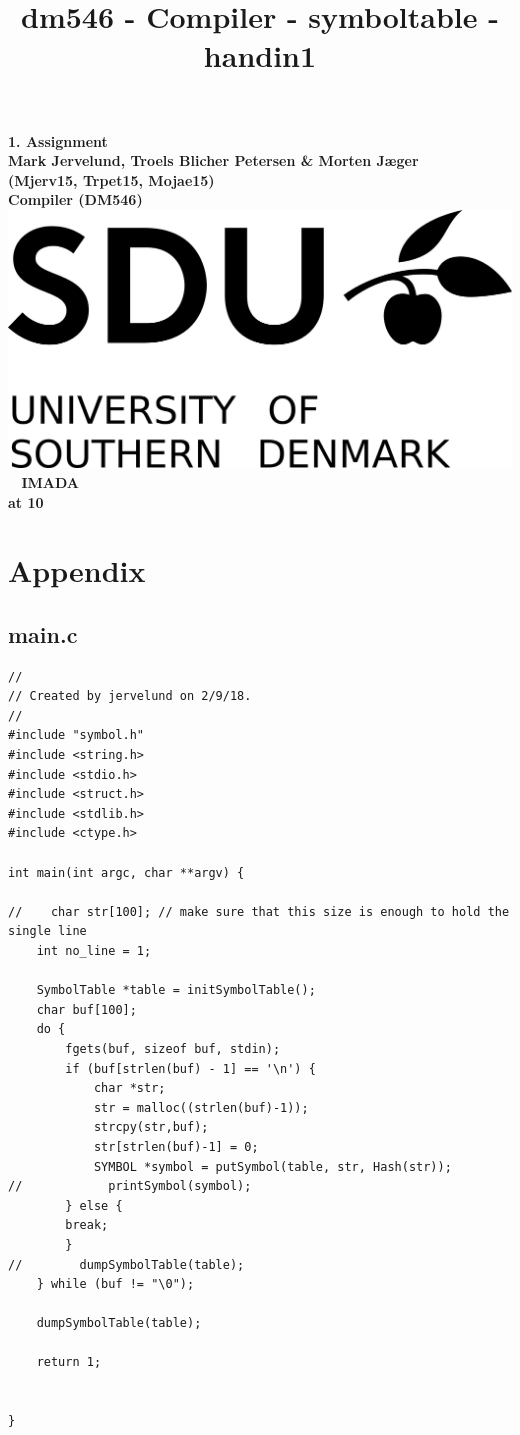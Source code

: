 \documentclass[a4paper,10pt,titlepage]{report}
\date{}
\title{dm546 - Compiler - symboltable - handin1}
\begin{document}
\begin{titlepage}
\centering
    \vspace*{9\baselineskip}
    \huge
    \bfseries
    1. Assignment \\
    \normalfont 
    Mark Jervelund, Troels Blicher Petersen \& Morten Jæger  \\
    (Mjerv15, Trpet15, Mojae15) \\
	\huge    
    Compiler (DM546)  \\[4\baselineskip]
    \normalfont
	\includegraphics[scale=1]{SDU_logo}
    \vfill\ 
    \vspace{5mm}
    IMADA \\

    \textbf{\datedate}  \bf{at 10} \\[2\baselineskip]
\end{titlepage}

\renewcommand{\thepage}{\roman{page}}%
\tableofcontents
\newpage
\setcounter{page}{1}
\renewcommand{\thepage}{\arabic{page}}


\newpage


\newpage
\section{Appendix}
\subsection{main.c}
\begin{lstlisting}
//
// Created by jervelund on 2/9/18.
//
#include "symbol.h"
#include <string.h>
#include <stdio.h>
#include <struct.h>
#include <stdlib.h>
#include <ctype.h>

int main(int argc, char **argv) {

//    char str[100]; // make sure that this size is enough to hold the single line
    int no_line = 1;

    SymbolTable *table = initSymbolTable();
    char buf[100];
    do {
        fgets(buf, sizeof buf, stdin);
        if (buf[strlen(buf) - 1] == '\n') {
            char *str;
            str = malloc((strlen(buf)-1));
            strcpy(str,buf);
            str[strlen(buf)-1] = 0;
            SYMBOL *symbol = putSymbol(table, str, Hash(str));
//            printSymbol(symbol);
        } else {
        break;
        }
//        dumpSymbolTable(table);
    } while (buf != "\0");

    dumpSymbolTable(table);

    return 1;


}
\end{lstlisting}
\end{document}
